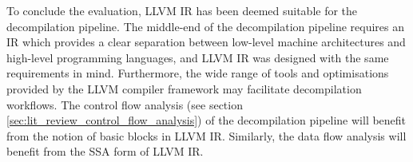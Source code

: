 To conclude the evaluation, LLVM IR has been deemed suitable for the decompilation pipeline. The middle-end of the decompilation pipeline requires an IR which provides a clear separation between low-level machine architectures and high-level programming languages, and LLVM IR was designed with the same requirements in mind. Furthermore, the wide range of tools and optimisations provided by the LLVM compiler framework may facilitate decompilation workflows. The control flow analysis (see section \ref{sec:lit_review_control_flow_analysis}) of the decompilation pipeline will benefit from the notion of basic blocks in LLVM IR. Similarly, the data flow analysis will benefit from the SSA form of LLVM IR.
